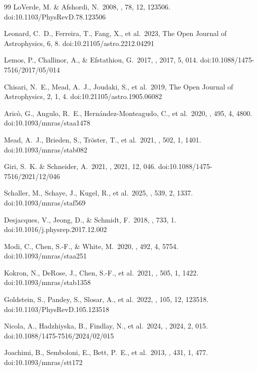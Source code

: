 \documentclass[a4paper, 11pt]{article}
\begin{document}
\begin{thebibliography}{99}
 LoVerde, M. \& Afshordi, N.\ 2008, \prd, 78, 12, 123506. doi:10.1103/PhysRevD.78.123506

 Leonard, C.~D., Ferreira, T., Fang, X., et al.\ 2023, The Open Journal of Astrophysics, 6, 8. doi:10.21105/astro.2212.04291

 Lemos, P., Challinor, A., \& Efstathiou, G.\ 2017, \jcap, 2017, 5, 014. doi:10.1088/1475-7516/2017/05/014

 Chisari, N.~E., Mead, A.~J., Joudaki, S., et al.\ 2019, The Open Journal of Astrophysics, 2, 1, 4. doi:10.21105/astro.1905.06082

 Aric{\`o}, G., Angulo, R.~E., Hern{\'a}ndez-Monteagudo, C., et al.\ 2020, \mnras, 495, 4, 4800. doi:10.1093/mnras/staa1478

 Mead, A.~J., Brieden, S., Tr{\"o}ster, T., et al.\ 2021, \mnras, 502, 1, 1401. doi:10.1093/mnras/stab082

 Giri, S.~K. \& Schneider, A.\ 2021, \jcap, 2021, 12, 046. doi:10.1088/1475-7516/2021/12/046

 Schaller, M., Schaye, J., Kugel, R., et al.\ 2025, \mnras, 539, 2, 1337. doi:10.1093/mnras/staf569

 Desjacques, V., Jeong, D., \& Schmidt, F.\ 2018, \physrep, 733, 1. doi:10.1016/j.physrep.2017.12.002

 Modi, C., Chen, S.-F., \& White, M.\ 2020, \mnras, 492, 4, 5754. doi:10.1093/mnras/staa251

 Kokron, N., DeRose, J., Chen, S.-F., et al.\ 2021, \mnras, 505, 1, 1422. doi:10.1093/mnras/stab1358

 Goldstein, S., Pandey, S., Slosar, A., et al.\ 2022, \prd, 105, 12, 123518. doi:10.1103/PhysRevD.105.123518

 Nicola, A., Hadzhiyska, B., Findlay, N., et al.\ 2024, \jcap, 2024, 2, 015. doi:10.1088/1475-7516/2024/02/015

 Joachimi, B., Semboloni, E., Bett, P.~E., et al.\ 2013, \mnras, 431, 1, 477. doi:10.1093/mnras/stt172


\end{thebibliography}
\end{document}

